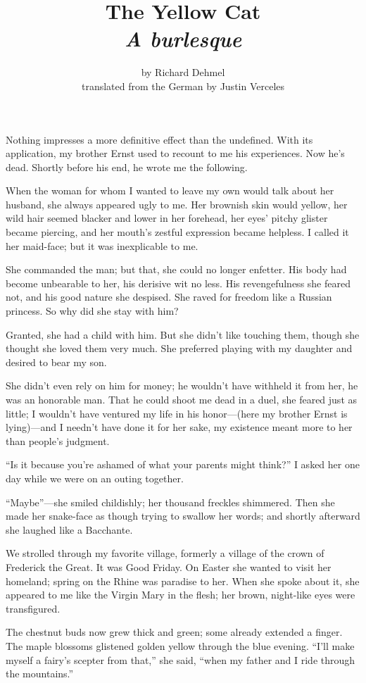 \documentclass[12pt,a4paper]{article}
\title{The Yellow Cat\\ \large{\textit{A burlesque}}}
\author{by Richard Dehmel\\translated from the German by Justin Verceles}
\date{}
\begin{document}
\maketitle

Nothing impresses a more definitive effect than the undefined. With its application, my brother Ernst used to recount to me his experiences. Now he’s dead. Shortly before his end, he wrote me the following.

When the woman for whom I wanted to leave my own would talk about her husband, she always appeared ugly to me. Her brownish skin would yellow, her wild hair seemed blacker and lower in her forehead, her eyes’ pitchy glister became piercing, and her mouth’s zestful expression became helpless. I called it her maid-face; but it was inexplicable to me.

She commanded the man; but that, she could no longer enfetter. His body had become unbearable to her, his derisive wit no less. His revengefulness she feared not, and his good nature she despised. She raved for freedom like a Russian princess. So why did she stay with him?

Granted, she had a child with him. But she didn’t like touching them, though she thought she loved them very much. She preferred playing with my daughter and desired to bear my son.

She didn’t even rely on him for money; he wouldn’t have withheld it from her, he was an honorable man. That he could shoot me dead in a duel, she feared just as little; I wouldn’t have ventured my life in his honor—(here my brother Ernst is lying)—and I needn’t have done it for her sake, my existence meant more to her than people’s judgment.

“Is it because you’re ashamed of what your parents might think?” I asked her one day while we were on an outing together.

“Maybe”—she smiled childishly; her thousand freckles shimmered. Then she made her snake-face as though trying to swallow her words; and shortly afterward she laughed like a Bacchante.

We strolled through my favorite village, formerly a village of the crown of Frederick the Great. It was Good Friday. On Easter she wanted to visit her homeland; spring on the Rhine was paradise to her. When she spoke about it, she appeared to me like the Virgin Mary in the flesh; her brown, night-like eyes were transfigured.

The chestnut buds now grew thick and green; some already extended a finger. The maple blossoms glistened golden yellow through the blue evening. “I’ll make myself a fairy’s scepter from that,” she said, “when my father and I ride through the mountains.”
\end{document}
